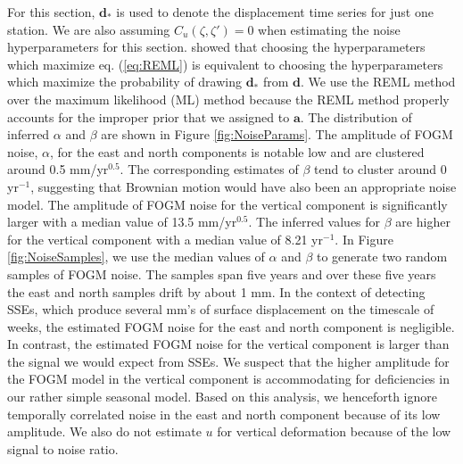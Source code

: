 \documentclass[10pt,letter]{article}
\begin{document}
For this section, $\bm{d}_*$ is used to denote the displacement time series for just one station. We are also assuming $C_u(\zeta,\zeta')=0$ when estimating the noise hyperparameters for this section. \citet{Harville1974} showed that choosing the hyperparameters which maximize eq. (\ref{eq:REML}) is equivalent to choosing the hyperparameters which maximize the probability of drawing $\bm{d}_*$ from $\bm{d}$.  We use the REML method over the maximum likelihood (ML) method \citep[e.g.,][]{Langbein1997} because the REML method properly accounts for the improper prior that we assigned to $\bm{a}$. The distribution of inferred $\alpha$ and $\beta$ are shown in Figure \ref{fig:NoiseParams}. The amplitude of FOGM noise, $\alpha$, for the east and north components is notable low and are clustered around 0.5 mm/yr$^{0.5}$. The corresponding estimates of $\beta$ tend to cluster around 0 yr$^{-1}$, suggesting that Brownian motion would have also been an appropriate noise model. The amplitude of FOGM noise for the vertical component is significantly larger with a median value of 13.5 mm/yr$^{0.5}$. The inferred values for $\beta$ are higher for the vertical component with a median value of 8.21 yr$^{-1}$. In Figure \ref{fig:NoiseSamples}, we use the median values of $\alpha$ and $\beta$ to generate two random samples of FOGM noise. The samples span five years and over these five years the east and north samples drift by about 1 mm. In the context of detecting SSEs, which produce several mm's of surface displacement on the timescale of weeks, the estimated FOGM noise for the east and north component is negligible. In contrast, the estimated FOGM noise for the vertical component is larger than the signal we would expect from SSEs. We suspect that the higher amplitude for the FOGM model in the vertical component is accommodating for deficiencies in our rather simple seasonal model. Based on this analysis, we henceforth ignore temporally correlated noise in the east and north component because of its low amplitude. We also do not estimate $u$ for vertical deformation because of the low signal to noise ratio.
\end{document}
